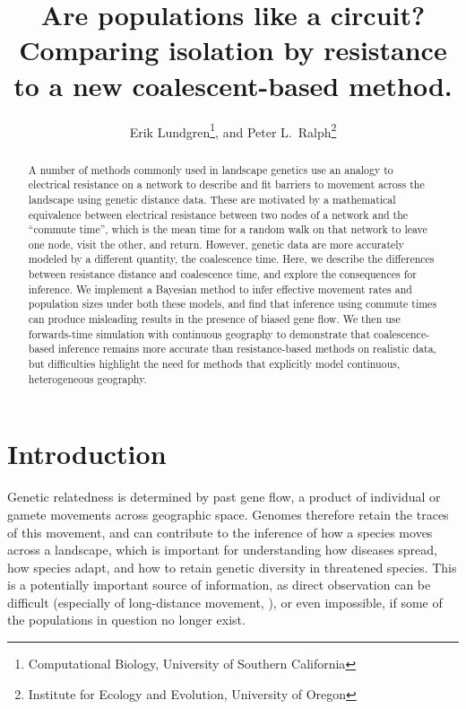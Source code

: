 \documentclass{article}
\begin{document}
\title{Are populations like a circuit? 
Comparing isolation by resistance to a new coalescent-based method.}
\author{Erik Lundgren\footnote{Computational Biology, University of Southern California}, and
        Peter L.\ Ralph\footnote{Institute for Ecology and Evolution, University of Oregon}}
\maketitle

\nolinenumbers

\begin{abstract}
A number of methods commonly used in landscape genetics
use an analogy to electrical resistance on a network
to describe and fit barriers to movement across the landscape
using genetic distance data.
These are motivated by a mathematical equivalence between electrical resistance 
between two nodes of a network
and the ``commute time'',
which is the mean time for a random walk on that network to leave one node, visit the other, and return.
However, genetic data are more accurately modeled by a different quantity,
the coalescence time.
Here, we describe the differences between resistance distance and coalescence time,
and explore the consequences for inference.
We implement a Bayesian method to infer effective movement rates and population sizes 
under both these models,
and find that inference using commute times
can produce misleading results in the presence of biased gene flow.
We then use forwards-time simulation with continuous geography to demonstrate that
coalescence-based inference remains more accurate than resistance-based methods on realistic data,
but difficulties highlight the need for methods 
that explicitly model continuous, heterogeneous geography.
\end{abstract}


\section*{Introduction}

Genetic relatedness is determined by past gene flow,
a product of individual or gamete movements across geographic space.
Genomes therefore retain the traces of this movement,
and can contribute to the inference of how a species moves across a landscape,
which is important for understanding how diseases spread, how species adapt,
and how to retain genetic diversity in threatened species.
This is a potentially important source of information,
as direct observation can be difficult 
(especially of long-distance movement, \citep{cayuelademographic,levin_et_al_seed_dispersal}),
or even impossible, if some of the populations in question no longer exist. 
\end{document}
